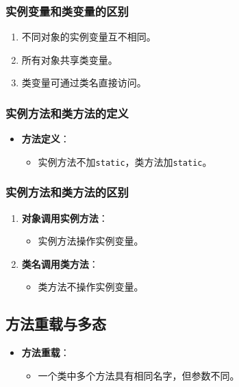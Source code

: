 \documentclass[a4paper, 10pt]{ctexart}
\begin{document}
\subsubsection{实例变量和类变量的区别}
\begin{enumerate}
  \item 不同对象的实例变量互不相同。
  \item 所有对象共享类变量。
  \item 类变量可通过类名直接访问。
\end{enumerate}

\subsubsection{实例方法和类方法的定义}
\begin{itemize}
  \item \textbf{方法定义}：
  \begin{itemize}
    \item 实例方法不加\texttt{static}，类方法加\texttt{static}。
  \end{itemize}
\end{itemize}

\subsubsection{实例方法和类方法的区别}
\begin{enumerate}
  \item \textbf{对象调用实例方法}：
  \begin{itemize}
    \item 实例方法操作实例变量。
  \end{itemize}
  \item \textbf{类名调用类方法}：
  \begin{itemize}
    \item 类方法不操作实例变量。
  \end{itemize}
\end{enumerate}

\subsection{方法重载与多态}
\begin{itemize}
  \item \textbf{方法重载}：
  \begin{itemize}
    \item 一个类中多个方法具有相同名字，但参数不同。
  \end{itemize}
\end{itemize}
\end{document}
